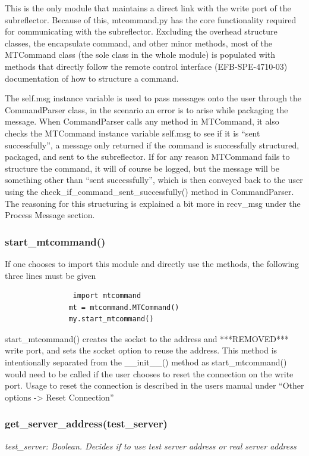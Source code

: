 \documentclass{article}
\begin{document}
This is the only module that maintains a direct link with the write port of the subreflector. Because of this, mtcommand.py has the core functionality required for communicating with the subreflector. Excluding  the overhead structure classes, the encapsulate command, and other minor methods, most of the MTCommand class (the sole class in the whole module) is populated with methods that directly follow the remote control interface (EFB-SPE-4710-03)  documentation of how to structure a command.

\vspace{10pt}
The self.msg instance variable is used to pass messages onto the user through the CommandParser class, in the scenario an error is to arise while packaging the message. When CommandParser calls any method in MTCommand, it also checks the MTCommand instance variable self.msg to see if it is ``sent successfully'', a message only returned if the command is successfully structured, packaged, and sent to the subreflector. If for any reason MTCommand fails to structure the command, it will of course be logged, but the message will be something other than ``sent successfully'', which is then conveyed back to the user using the check\_if\_command\_sent\_successfully() method in CommandParser.  The reasoning for this structuring is explained a bit more in recv\_msg under the Process Message section.



\subsubsection*{start\_mtcommand()}
If one chooses to import this module and directly use the methods, the following three lines must be given
    \begin{lstlisting}
    		    import mtcommand
               mt = mtcommand.MTCommand()
               my.start_mtcommand()
    \end{lstlisting}

start\_mtcommand() creates the socket to the address and ***REMOVED*** write port, and sets the socket option to reuse the address. This method is intentionally separated from the \_\_init\_\_() method as  start\_mtcommand() would need to be called if the user chooses to reset the connection on the write port. Usage to reset the connection is described in the users manual under ``Other options -> Reset Connection''

\subsubsection*{get\_server\_address(test\_server)}
\emph{test\_server:  Boolean. Decides if to use test server address or real server address}
\vspace{10pt}
\end{document}
